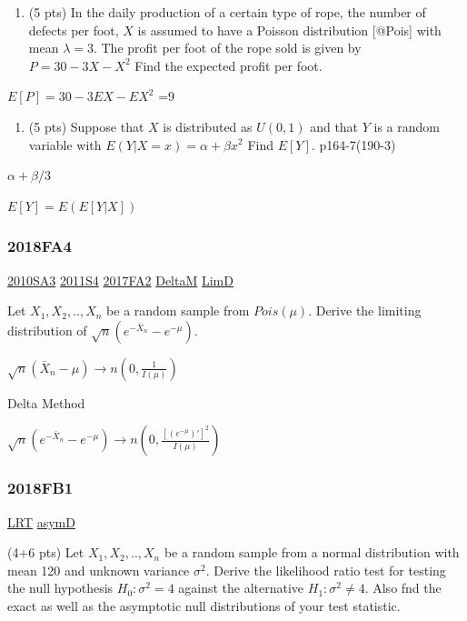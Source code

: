 \documentclass[10pt,twocolumn,portrait]{article}
\providecommand{\tightlist}{%
  \setlength{\itemsep}{0pt}\setlength{\parskip}{0pt}}
\begin{document}
\begin{enumerate}
\def\labelenumi{(\alph{enumi})}
\tightlist
\item
  (5 pts) In the daily production of a certain type of rope, the number
  of defects per foot, \(X\) is assumed to have a Poisson distribution
  {[}@Pois{]} with mean \(\lambda=3\). The profit per foot of the rope
  sold is given by \(P=30-3X-X^2\) Find the expected profit per foot.
\end{enumerate}

\(E[P]=30-3EX-EX^2\) =9

\begin{enumerate}
\def\labelenumi{(\alph{enumi})}
\setcounter{enumi}{1}
\tightlist
\item
  (5 pts) Suppose that \(X\) is distributed as \(U(0,1)\) and that \(Y\)
  is a random variable with \(E(Y|X=x)=\alpha+\beta x^2\) Find \(E[Y]\).
  p164-7(190-3)
\end{enumerate}

\(\alpha+\beta/3\)

\(E[Y]=E(E[Y|X])\)

\hypertarget{fa4-4}{%
\subsubsection{2018FA4}\label{fa4-4}}

\protect\hyperlink{sa3-1}{2010SA3} \protect\hyperlink{s4-2}{2011S4}
\protect\hyperlink{fa2-3}{2017FA2} \protect\hyperlink{DeltaM}{DeltaM}
\protect\hyperlink{LimD}{LimD}

Let \(X_1,X_2,..,X_n\) be a random sample from \(Pois(\mu)\). Derive the
limiting distribution of \(\sqrt{n}(e^{-\bar X_n}-e^{-\mu})\).

\(\sqrt{n}(\bar X_n-\mu)\to n(0,\frac1{I(\mu)})\)

Delta Method

\(\sqrt{n}(e^{-\bar X_n}-e^{-\mu})\to n(0,\frac{[(e^{-\mu})']^2}{I(\mu)})\)

\hypertarget{fb1-4}{%
\subsubsection{2018FB1}\label{fb1-4}}

\protect\hyperlink{LRT}{LRT} \protect\hyperlink{asymD}{asymD}

(4+6 pts) Let \(X_1,X_2,..,X_n\) be a random sample from a normal
distribution with mean 120 and unknown variance \(\sigma^2\). Derive the
likelihood ratio test for testing the null hypothesis \(H_0:\sigma^2=4\)
against the alternative \(H_1:\sigma^2\neq4\). Also fnd the exact as
well as the asymptotic null distributions of your test statistic.
\end{document}
